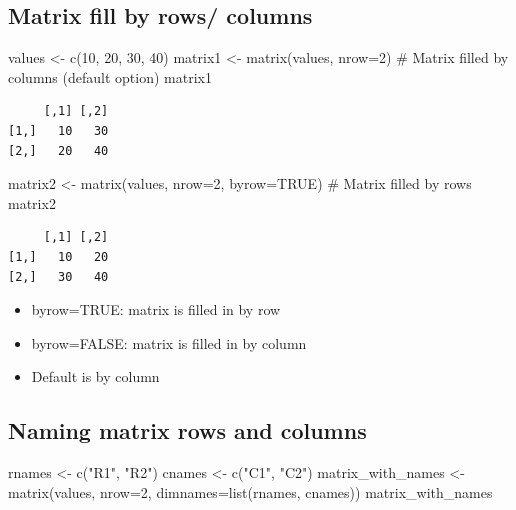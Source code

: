 \documentclass[
  letterpaper,
  DIV=11,
  numbers=noendperiod]{scrreprt}
\newenvironment{Shaded}{\begin{snugshade}}{\end{snugshade}}
\newcommand{\AttributeTok}[1]{\textcolor[rgb]{0.40,0.45,0.13}{#1}}
\newcommand{\CommentTok}[1]{\textcolor[rgb]{0.37,0.37,0.37}{#1}}
\newcommand{\ConstantTok}[1]{\textcolor[rgb]{0.56,0.35,0.01}{#1}}
\newcommand{\DecValTok}[1]{\textcolor[rgb]{0.68,0.00,0.00}{#1}}
\newcommand{\FunctionTok}[1]{\textcolor[rgb]{0.28,0.35,0.67}{#1}}
\newcommand{\NormalTok}[1]{\textcolor[rgb]{0.00,0.23,0.31}{#1}}
\newcommand{\OtherTok}[1]{\textcolor[rgb]{0.00,0.23,0.31}{#1}}
\newcommand{\StringTok}[1]{\textcolor[rgb]{0.13,0.47,0.30}{#1}}
\begin{document}
\subsection{Matrix fill by rows/
columns}\label{matrix-fill-by-rows-columns}

\begin{Shaded}
\begin{Highlighting}[]
\NormalTok{values }\OtherTok{\textless{}{-}} \FunctionTok{c}\NormalTok{(}\DecValTok{10}\NormalTok{, }\DecValTok{20}\NormalTok{, }\DecValTok{30}\NormalTok{, }\DecValTok{40}\NormalTok{)}
\NormalTok{matrix1 }\OtherTok{\textless{}{-}} \FunctionTok{matrix}\NormalTok{(values, }\AttributeTok{nrow=}\DecValTok{2}\NormalTok{) }\CommentTok{\# Matrix filled by columns (default option)}
\NormalTok{matrix1}
\end{Highlighting}
\end{Shaded}

\begin{verbatim}
     [,1] [,2]
[1,]   10   30
[2,]   20   40
\end{verbatim}

\begin{Shaded}
\begin{Highlighting}[]
\NormalTok{matrix2 }\OtherTok{\textless{}{-}} \FunctionTok{matrix}\NormalTok{(values, }\AttributeTok{nrow=}\DecValTok{2}\NormalTok{, }\AttributeTok{byrow=}\ConstantTok{TRUE}\NormalTok{) }\CommentTok{\# Matrix filled by rows}
\NormalTok{matrix2}
\end{Highlighting}
\end{Shaded}

\begin{verbatim}
     [,1] [,2]
[1,]   10   20
[2,]   30   40
\end{verbatim}

\begin{itemize}
\item
  byrow=TRUE: matrix is filled in by row
\item
  byrow=FALSE: matrix is filled in by column
\item
  Default is by column
\end{itemize}

\subsection{Naming matrix rows and
columns}\label{naming-matrix-rows-and-columns}

\begin{Shaded}
\begin{Highlighting}[]
\NormalTok{rnames }\OtherTok{\textless{}{-}} \FunctionTok{c}\NormalTok{(}\StringTok{"R1"}\NormalTok{, }\StringTok{"R2"}\NormalTok{)}
\NormalTok{cnames }\OtherTok{\textless{}{-}} \FunctionTok{c}\NormalTok{(}\StringTok{"C1"}\NormalTok{, }\StringTok{"C2"}\NormalTok{)}
\NormalTok{matrix\_with\_names }\OtherTok{\textless{}{-}} \FunctionTok{matrix}\NormalTok{(values, }\AttributeTok{nrow=}\DecValTok{2}\NormalTok{, }\AttributeTok{dimnames=}\FunctionTok{list}\NormalTok{(rnames, cnames))}
\NormalTok{matrix\_with\_names}
\end{Highlighting}
\end{Shaded}
\end{document}

